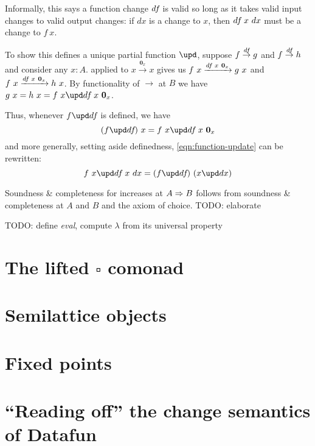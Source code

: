 \documentclass[]{rntz}
\newcommand\todo[1]{{\color{Rhodamine}#1}}
\newcommand\zero{\ensuremath{\mathbold{0}}}
\newcommand\iso{\texorpdfstring{\ensuremath{\square}}{iso}}
\newcommand\fname[1]{\textit{#1}}
\newcommand\vals[1]{#1^v} %
\newcommand\bindsp{~\,}
\newcommand\fa[1]{\forall #1.\bindsp}
\newcommand\ex[1]{\exists #1.\bindsp}
\newcommand\validarrow\to
\newcommand\vld[3]{{#2 \mathrel{\overset{#1}{\validarrow}} #3}}
\newcommand\longvld[3]{{#2 \xrightarrow{#1} #3}}
\begin{document}
\noindent Informally, this says a function change $d\kern-.1em f\kern-.1em$ is valid so long as it
takes valid input changes to valid output changes: if $dx$ is a change to $x$,
then $d\kern-.1em f\kern-.1em~x~dx$ must be a change to $f~x$.

To show this defines a unique partial function $\upd$, suppose $\vld\df f g$ and
$\vld\df f h$ and consider any $x : A$.  applied to
$\vld{\zero_x} x x$ gives us $\longvld{\df~x~\zero_x}{f~x}{g~x}$ and
$\longvld{\df~x~\zero_x}{f~x}{h~x}$. By functionality of $\validarrow$ at $B$ we
have $g~x = h~x = f~x \upd \df~x~\zero_x$.

Thus, whenever $f \upd \df$ is defined, we have
%
\[ (f \upd \df)~x = f~x \upd \df~x~\zero_x \]
%
and more generally, setting aside definedness, \cref{eqn:function-update} can be
rewritten:
%
\[ f~x \upd \df~x~dx = (f \upd \df)~(x \upd dx) \]

\noindent
Soundness \& completeness for increases at $A \Rightarrow B$ follows from soundness \&
completeness at $A$ and $B$ and the axiom of choice. \todo{TODO: elaborate}


% 


\newcommand\fn\lambda
\todo{TODO: define \fname{eval}, compute $\fn$ from its universal property}


\section{The lifted \iso{} comonad}

\section{Semilattice objects}

\section{Fixed points}


\section{``Reading off'' the change semantics of Datafun}
\end{document}
